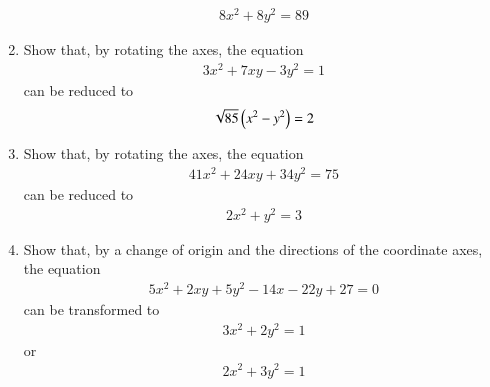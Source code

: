\begin{enumerate}[1.]
\begin{align*}
8x^2+8y^2 = 89
\end{align*}
\item Show that, by rotating the axes, the equation
\begin{align*}
3x^2+7xy-3y^2 = 1
\end{align*}
can be reduced to 
\begin{align*}
\sqrt{85}\left(x^2-y^2\right)=2
\end{align*}
\item Show that, by rotating the axes, the equation
\begin{align*}
41x^2+24xy+34y^2=75
\end{align*}
can be reduced to 
\begin{align*}
2x^2+y^2 = 3
\end{align*}
\item Show that, by a change of origin and the directions of the coordinate axes, the equation
\begin{align*}
5x^2+2xy+5y^2-14x-22y+27=0
\end{align*}
can be transformed to
\begin{align*}
3x^2+2y^2 = 1
\end{align*}
or
\begin{align*}
2x^2+3y^2 = 1
\end{align*}
\end{enumerate}